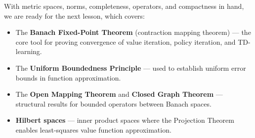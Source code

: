 \documentclass[11pt,a4paper]{article}
\theoremstyle{definition}
\theoremstyle{plain}
\theoremstyle{remark}
\begin{document}
\bigskip

\begin{rlconnection}
With metric spaces, norms, completeness, operators, and compactness in hand, we are
ready for the next lesson, which covers:
\begin{itemize}[nosep]
    \item The \textbf{Banach Fixed-Point Theorem} (contraction mapping theorem) ---
    the core tool for proving convergence of value iteration, policy iteration, and
    TD-learning.
    \item The \textbf{Uniform Boundedness Principle} --- used to establish uniform
    error bounds in function approximation.
    \item The \textbf{Open Mapping Theorem} and \textbf{Closed Graph Theorem} ---
    structural results for bounded operators between Banach spaces.
    \item \textbf{Hilbert spaces} --- inner product spaces where the Projection
    Theorem enables least-squares value function approximation.
\end{itemize}
\end{rlconnection}
\end{document}
